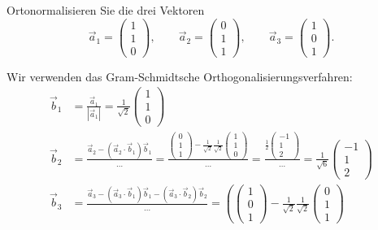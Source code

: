 Ortonormalisieren Sie die drei Vektoren
\[
\vec{a}_1=\begin{pmatrix}1\\1\\0\end{pmatrix},\qquad
\vec{a}_2=\begin{pmatrix}0\\1\\1\end{pmatrix},\qquad
\vec{a}_3=\begin{pmatrix}1\\0\\1\end{pmatrix}.
\]


\begin{loesung}
Wir verwenden das Gram-Schmidtsche Orthogonalisierungsverfahren:
\begin{align*}
\vec{b}_1
&=
\frac{\vec{a}_1}{|\vec{a}_1|}
=
\frac1{\sqrt{2}}\begin{pmatrix}1\\1\\0\end{pmatrix}
\\
\vec{b}_2
&=
\frac{\vec{a}_2 - (\vec{a}_2\cdot\vec{b}_1)\vec{b}_1}{\dots}
=
\frac{\displaystyle\begin{pmatrix}0\\1\\1\end{pmatrix}-\frac1{\sqrt{2}}\frac1{\sqrt{2}}\begin{pmatrix}1\\1\\0\end{pmatrix}}{\dots}
=
\frac{\displaystyle\frac12\begin{pmatrix}-1\\1\\2\end{pmatrix}}{\dots}
=
\frac{1}{\sqrt{6}}\begin{pmatrix}-1\\1\\2\end{pmatrix}
\\
\vec{b}_3
&=
\frac{\vec{a}_3-(\vec{a}_3\cdot\vec{b}_1)\vec{b}_1-(\vec{a}_3\cdot\vec{b}_2)\vec{b}_2}{\dots}
=
\left(
\begin{pmatrix}1\\0\\1\end{pmatrix}
-\frac1{\sqrt{2}}\frac1{\sqrt{2}}\begin{pmatrix}0\\1\\1\end{pmatrix}

\end{align*}
\end{loesung}
